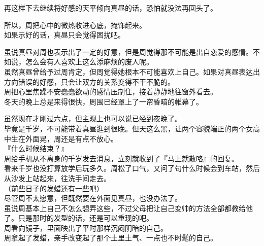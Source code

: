再这样下去继续将好感的天平倾向真昼的话，恐怕就没法再回头了。

所以，周把心中的微热收进心底，掩饰起来。\\

如果示好的话，真昼只会觉得困扰吧。

虽说真昼对周也表示出了一定的好意，但是周觉得那不可能是出自恋爱的感情。不如说，怎么会有人喜欢上这么添麻烦的废人呢。\\

虽然真昼曾给予过周肯定，但周觉得她根本不可能喜欢上自己。如果对真昼表达出方向错误的好感，只会让双方的关系变得不干不脆的。\\

周把心里焦躁不安蠢蠢欲动的感情压制住，接着静静地往窗外看去。\\

冬天的晚上总是来得很快，周围已经罩上了一帘昏暗的帷幕了。

虽然现在才刚过六点，但主观上也可以说已经到夜晚了。\\

毕竟是千岁，不可能带着真昼逛到很晚。但天这么黑，让两个容貌端正的两个女高中生在外面晃，周还是有点不放心。\\

『什么时候结束？』\\

周给手机从不离身的千岁发去消息，立刻就收到了『马上就散咯』的回复。\\

看来千岁也没打算放学后玩多久。周松了口气，又问了句什么时候会到车站，然后从沙发上站起来，往洗手间走去。\\

（前些日子的发蜡还有一些吧）\\

尽管周不太愿意，但既然要在外面见真昼，也没办法了。\\

虽说周基本上自己不怎么想弄这些，不过父母把让自己变帅的方法全部都教给他了。只是那时的发型的话，还是可以重现的吧。\\

周看向镜子，里面映出了平时那样沉闷阴暗的自己。\\

周拿起了发蜡，亲手改变起了那个土里土气、一点也不时髦的自己。
